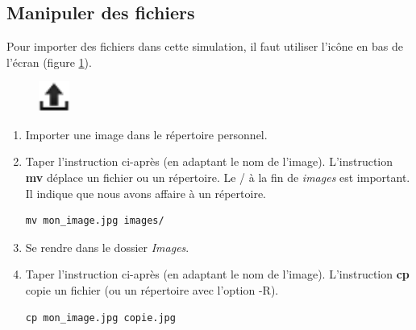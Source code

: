 \documentclass[a4paper,11pt]{article}
\begin{document}
\begin{Form}
\subsection{Manipuler des fichiers}
Pour importer des fichiers dans cette simulation, il faut utiliser l'icône en bas de l'écran (figure \ref{up}).
\begin{figure}[!h]
\centering
\includegraphics[width=1cm]{ressources/upload-icon.png}
\label{up}
\end{figure}
\begin{activite}
\begin{enumerate}
\item Importer une image dans le répertoire personnel.
\item Taper l'instruction ci-après (en adaptant le nom de l'image). L'instruction \textbf{mv} déplace un fichier ou un répertoire. Le / à la fin de \emph{images} est important. Il indique que nous avons affaire à un répertoire.
\begin{lstlisting}
mv mon_image.jpg images/
\end{lstlisting}
\item Se rendre dans le dossier \emph{Images}.
\item Taper l'instruction ci-après (en adaptant le nom de l'image). L'instruction \textbf{cp} copie un fichier (ou un répertoire avec l'option -R).
\begin{lstlisting}
cp mon_image.jpg copie.jpg
\end{lstlisting}
\end{enumerate}
\end{activite}

\end{Form}
\end{document}
